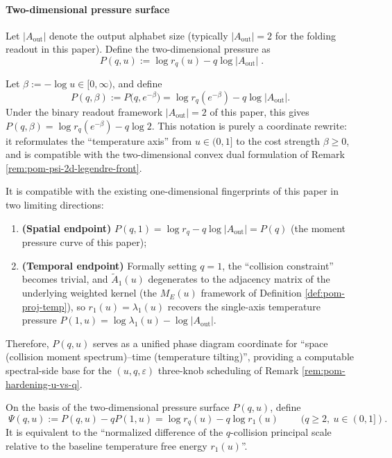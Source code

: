 \paragraph{Two-dimensional pressure surface}
Let \(|A_{\mathrm{out}}|\) denote the output alphabet size (typically \(|A_{\mathrm{out}}|=2\) for the folding readout in this paper).
Define the two-dimensional pressure as
\[
\boxed{\;
P(q,u):=\log r_q(u)-q\log|A_{\mathrm{out}}|\;}.
\]
\begin{remark}[Temperature parameter reparametrization: \texorpdfstring{$u=e^{-\beta}$}{u=exp(-beta)} and the pressure surface \texorpdfstring{$P(q,\beta)$}{P(q,beta)}]\label{rem:pom-pressure-beta-reparam}
Let \(\beta:=-\log u\in[0,\infty)\), and define
\[
P(q,\beta):=P\!\bigl(q,e^{-\beta}\bigr)=\log r_q(e^{-\beta})-q\log|A_{\mathrm{out}}|.
\]
Under the binary readout framework \(|A_{\mathrm{out}}|=2\) of this paper, this gives \(P(q,\beta)=\log r_q(e^{-\beta})-q\log 2\).
This notation is purely a coordinate rewrite: it reformulates the ``temperature axis'' from \(u\in(0,1]\) to the cost strength \(\beta\ge 0\), and is compatible with the two-dimensional convex dual formulation of Remark \ref{rem:pom-psi-2d-legendre-front}.
\end{remark}
It is compatible with the existing one-dimensional fingerprints of this paper in two limiting directions:
\begin{enumerate}
  \item \textbf{(Spatial endpoint)} \(P(q,1)=\log r_q-q\log|A_{\mathrm{out}}|=P(q)\) (the moment pressure curve of this paper);
  \item \textbf{(Temporal endpoint)} Formally setting \(q=1\), the ``collision constraint'' becomes trivial, and \(\widetilde A_1(u)\) degenerates to the adjacency matrix of the underlying weighted kernel (the \(M_E(u)\) framework of Definition \ref{def:pom-proj-temp}), so \(r_1(u)=\lambda_1(u)\) recovers the single-axis temperature pressure \(P(1,u)=\log\lambda_1(u)-\log|A_{\mathrm{out}}|\).
\end{enumerate}
Therefore, \(P(q,u)\) serves as a unified phase diagram coordinate for ``space (collision moment spectrum)--time (temperature tilting)'', providing a computable spectral-side base for the \((u,q,\varepsilon)\) three-knob scheduling of Remark \ref{rem:pom-hardening-u-vs-q}.

\begin{definition}\label{def:pom-psi-mixed-pressure}
On the basis of the two-dimensional pressure surface \(P(q,u)\), define
\[
\boxed{\;
\Psi(q,u):=P(q,u)-qP(1,u)
=\log r_q(u)-q\log r_1(u)\;}
\qquad(q\ge 2,\ u\in(0,1]).
\]
It is equivalent to the ``normalized difference of the \(q\)-collision principal scale relative to the baseline temperature free energy \(r_1(u)\)''.
\end{definition}

